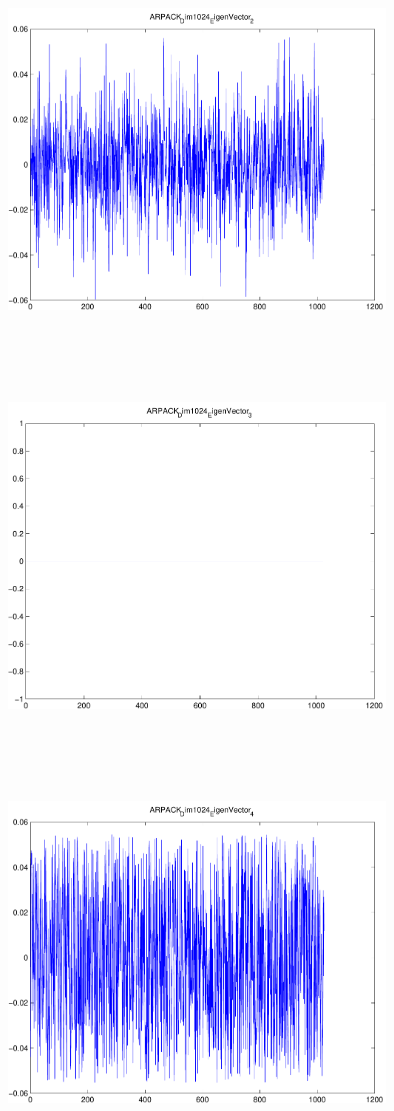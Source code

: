 \documentclass[9pt]{article}
\theoremstyle{plain}
\theoremstyle{definition}
\theoremstyle{remark}
\numberwithin{equation}{section}
\begin{document}
\includegraphics[width=10.0cm,height=10.0cm]{ARPACK_Dim1024_EigenVector_2.pdf}

\includegraphics[width=10.0cm,height=10.0cm]{ARPACK_Dim1024_EigenVector_3.pdf}

\includegraphics[width=10.0cm,height=10.0cm]{ARPACK_Dim1024_EigenVector_4.pdf}
\end{document}
